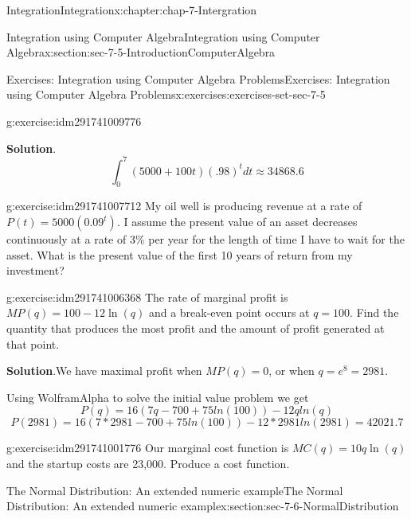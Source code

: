 \documentclass[oneside,10pt,]{book}
\numberwithin{equation}{section}
\begin{document}
\begin{chapterptx}{Integration}{}{Integration}{}{}{x:chapter:chap-7-Intergration}
\begin{sectionptx}{Integration using Computer Algebra}{}{Integration using Computer Algebra}{}{}{x:section:sec-7-5-IntroductionComputerAlgebra}
\begin{exercises-subsection}{Exercises: Integration using Computer Algebra Problems}{}{Exercises: Integration using Computer Algebra Problems}{}{}{x:exercises:exercises-set-sec-7-5}
\begin{divisionexercise}{21}{}{}{g:exercise:idm291741009776}
\par\smallskip%
\noindent\textbf{Solution}.\hypertarget{g:solution:idm291741008576}{}\quad{}%
\begin{equation*}
\int_0^7(5000+100t) (.98)^t dt\approx 34868.6
\end{equation*}
\end{divisionexercise}%
\begin{divisionexercise}{22}{}{}{g:exercise:idm291741007712}%
My oil well is producing revenue at a rate of \(P(t)=5000(0.09^t)\).  I assume the present value of an asset decreases continuously at a rate of 3\% per year for the length of time I have to wait for the asset.  What is the present value of the first 10 years of return from my investment?%
\end{divisionexercise}%
\begin{divisionexercise}{23}{}{}{g:exercise:idm291741006368}%
The rate of marginal profit is \(MP(q)=100-12\ln(q)\) and a break-even point occurs at \(q=100\). Find the quantity that produces the most profit and the amount of profit generated at that point.%
\par\smallskip%
\noindent\textbf{Solution}.\hypertarget{g:solution:idm291741004832}{}\quad{}We have maximal profit when \(MP(q)=0\), or when \(q=e^8=2981\).%
\par
Using WolframAlpha to solve the initial value problem we get%
%
\begin{equation*}
P(q)=16(7q-700+75ln(100))-12q ln(q)
\end{equation*}
%
\begin{equation*}
P(2981)= 16(7*2981-700+75ln(100))-12*2981 ln(2981)=42021.7
\end{equation*}
\end{divisionexercise}%
\begin{divisionexercise}{24}{}{}{g:exercise:idm291741001776}%
Our marginal cost function is \(MC(q)=10q \ln(q)\) and the startup costs are \textdollar{}23,000.  Produce a cost function.%
\end{divisionexercise}%
\end{exercises-subsection}
\end{sectionptx}
%
%
\typeout{************************************************}
\typeout{************************************************}
%
\begin{sectionptx}{The Normal Distribution: An extended numeric example}{}{The Normal Distribution: An extended numeric example}{}{}{x:section:sec-7-6-NormalDistribution}

\end{sectionptx}
\end{chapterptx}
\end{document}
